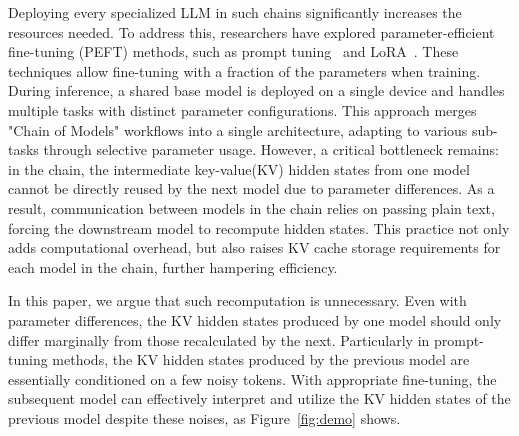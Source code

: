 Deploying every specialized LLM in such chains significantly increases the resources needed. To address this, researchers have explored parameter-efficient fine-tuning (PEFT) methods, such as prompt tuning~\cite{liu2021p} and LoRA~\cite{hu2021lora}. These techniques allow fine-tuning with a fraction of the parameters when training. During inference, a shared base model is deployed on a single device and handles multiple tasks with distinct parameter configurations. This approach merges "Chain of Models" workflows into a single architecture, adapting to various sub-tasks through selective parameter usage.
However, a critical bottleneck remains: in the chain, the intermediate key-value(KV) hidden states from one model cannot be directly reused by the next model due to parameter differences. As a result, communication between models in the chain relies on passing plain text, forcing the downstream model to recompute hidden states. This practice not only adds computational overhead, but also raises KV cache storage requirements for each model in the chain, further hampering efficiency.

In this paper, we argue that such recomputation is unnecessary. Even with parameter differences, the KV hidden states produced by one model should only differ marginally from those recalculated by the next. Particularly in prompt-tuning methods, the KV hidden states produced by the previous model are essentially conditioned on a few noisy tokens.
With appropriate fine-tuning, the subsequent model can effectively interpret and utilize the KV hidden states of the previous model despite these noises, as Figure~\ref{fig:demo} shows. 


